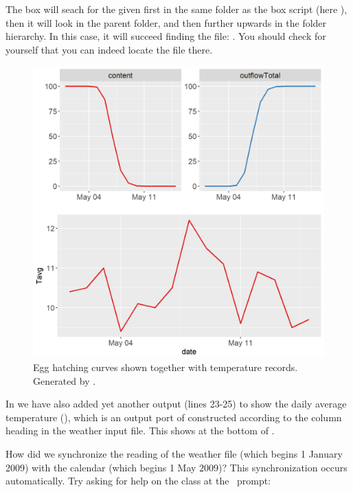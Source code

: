 The  box will seach for the given  first in the same folder as the box script (here ), then it will look in the parent folder, and then further upwards in the folder hierarchy. In this case, it will succeed finding the file: . You should check for yourself that you can indeed locate the file there.

\begin{figure} 
\centering
\includegraphics[scale=0.5]{graphics/egg4}
\caption{Egg hatching curves shown together with temperature records. Generated by .}
\label{fig:egg4}
\end{figure}

In  we have also added yet another  output (lines 23-25) to show the daily average temperature (), which is an output port of  constructed according to the column heading in the weather input file. This shows at the bottom of .

How did we synchronize the reading of the weather file (which begins 1 January 2009) with the calendar (which begins 1 May 2009)? This synchronization occurs automatically. Try asking for help on the  class at the \US\ prompt:

